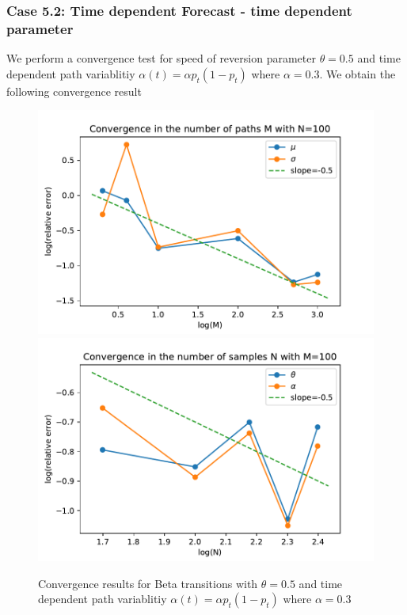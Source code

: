 \documentclass[aspectratio=169]{beamer}\usepackage[utf8]{inputenc}
\begin{document}
\begin{frame}\frametitle{ Case 5.2: Time dependent Forecast - time dependent parameter }
We perform a convergence test for speed of reversion parameter $\theta = 0.5$ and time dependent path variablitiy $\alpha (t) =  \alpha p_t (1-p_t)$ where $\alpha=0.3$. We obtain the following convergence result
\begin{figure}
    \includegraphics[scale=0.4]{Figures/conv_M_beta_flex_10.pdf}
    \includegraphics[scale=0.4]{Figures/conv_N_beta_flex_35.pdf}
  \caption{ Convergence results for Beta transitions with $\theta = 0.5$ and time dependent path variablitiy $\alpha (t) =  \alpha p_t (1-p_t)$ where $\alpha=0.3$   }
\end{figure}

\end{frame}

%
%
%
%
%
%
%
%
%
%
%


\end{document}
